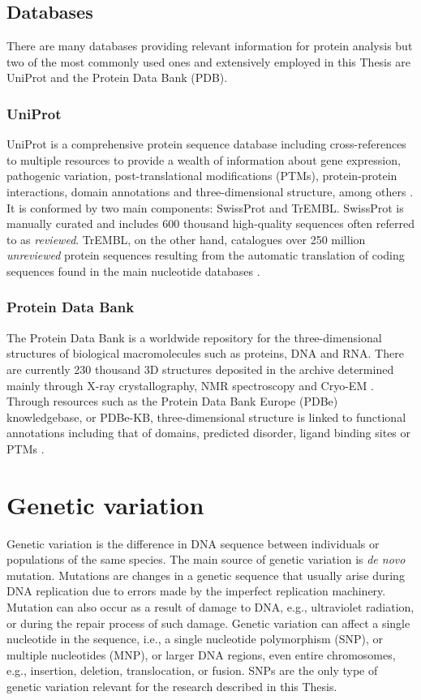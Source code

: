 \subsection{Databases}

There are many databases providing relevant information for protein analysis but two of the most commonly used ones and extensively employed in this Thesis are UniProt and the Protein Data Bank (PDB).

\subsubsection{UniProt}

UniProt is a comprehensive protein sequence database including cross-references to multiple resources to provide a wealth of information about gene expression, pathogenic variation, post-translational modifications (PTMs), protein-protein interactions, domain annotations and three-dimensional structure, among others \cite{BAIROCH_2005_UNIPROT}. It is conformed by two main components: SwissProt and TrEMBL. SwissProt is manually curated and includes 600 thousand high-quality sequences often referred to as \textit{reviewed}. TrEMBL, on the other hand, catalogues over 250 million \textit{unreviewed} protein sequences resulting from the automatic translation of coding sequences found in the main nucleotide databases \cite{BAIROCH_2000_UNIPROT}.

\subsubsection{Protein Data Bank}

The Protein Data Bank is a worldwide repository for the three-dimensional structures of biological macromolecules such as proteins, DNA and RNA. There are currently 230 thousand 3D structures deposited in the archive determined mainly through X-ray crystallography, NMR spectroscopy and Cryo-EM \cite{BERMAN_2003_PDB}. Through resources such as the Protein Data Bank Europe (PDBe) knowledgebase, or PDBe-KB, three-dimensional structure is linked to functional annotations including that of domains, predicted disorder, ligand binding sites or PTMs \cite{PDBEKB_2019_PDBEKB}.

\section{Genetic variation}

Genetic variation is the difference in DNA sequence between individuals or populations of the same species. The main source of genetic variation is \textit{de novo} mutation. Mutations are changes in a genetic sequence that usually arise during DNA replication due to errors made by the imperfect replication machinery. Mutation can also occur as a result of damage to DNA, e.g., ultraviolet radiation, or during the repair process of such damage. Genetic variation can affect a single nucleotide in the sequence, i.e., a single nucleotide polymorphism (SNP), or multiple nucleotides (MNP), or larger DNA regions, even entire chromosomes, e.g., insertion, deletion, translocation, or fusion. SNPs are the only type of genetic variation relevant for the research described in this Thesis.


